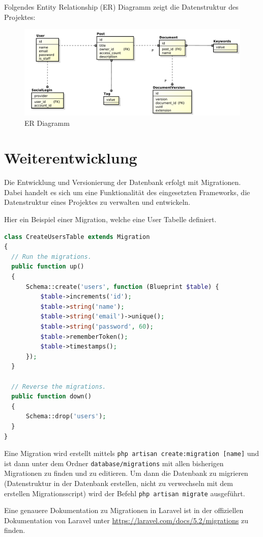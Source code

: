 Folgendes Entity Relationship (ER) Diagramm zeigt die Datenstruktur des Projektes:
\begin{figure}[H]
	\begin{center}
		\includegraphics[width=\linewidth]{images/Datenstruktur.pdf}
		\caption{ER Diagramm}
	\end{center}
\end{figure}

\section{Weiterentwicklung}
Die Entwicklung und Versionierung der Datenbank erfolgt mit Migrationen.
Dabei handelt es sich um eine Funktionalit\"at des eingesetzten Frameworks, die Datenstruktur eines Projektes zu verwalten und entwickeln.

Hier ein Beispiel einer Migration, welche eine User Tabelle definiert.
\begin{lstlisting}[language={PHP}, caption=Beispiel eine Migration]
class CreateUsersTable extends Migration
{
  // Run the migrations.
  public function up()
  {
      Schema::create('users', function (Blueprint $table) {
          $table->increments('id');
          $table->string('name');
          $table->string('email')->unique();
          $table->string('password', 60);
          $table->rememberToken();
          $table->timestamps();
      });
  }

  // Reverse the migrations.
  public function down()
  {
      Schema::drop('users');
  }
}
\end{lstlisting}

Eine Migration wird erstellt mittels \texttt{php artisan create:migration [name]} und ist dann unter dem Ordner \texttt{database/migrations} mit allen bisherigen Migrationen zu finden und zu editieren.
Um dann die Datenbank zu migrieren (Datenstruktur in der Datenbank erstellen, nicht zu verwechseln mit dem erstellen Migrationsscript) wird der Befehl \texttt{php artisan migrate} ausgef\"uhrt.

Eine genauere Dokumentation zu Migrationen in Laravel ist in der offiziellen Dokumentation von Laravel unter \url{https://laravel.com/docs/5.2/migrations} zu finden.
